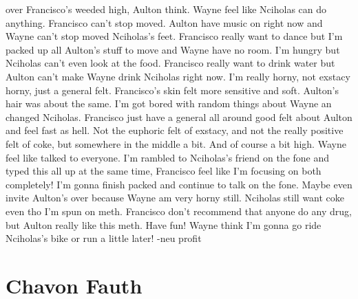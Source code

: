 \documentclass[12pt]{book}
\begin{document}
over Francisco's weeded high, Aulton think. Wayne feel like Nciholas can do anything. Francisco can't stop moved. Aulton have music on right now and Wayne can't stop moved Nciholas's feet. Francisco really want to dance but I'm packed up all Aulton's stuff to move and Wayne have no room. I'm hungry but Nciholas can't even look at the food. Francisco really want to drink water but Aulton can't make Wayne drink Nciholas right now. I'm really horny, not exstacy horny, just a general felt. Francisco's skin felt more sensitive and soft. Aulton's hair was about the same. I'm got bored with random things about Wayne an changed Nciholas. Francisco just have a general all around good felt about Aulton and feel fast as hell. Not the euphoric felt of exstacy, and not the really positive felt of coke, but somewhere in the middle a bit. And of course a bit high. Wayne feel like talked to everyone. I'm rambled to Nciholas's friend on the fone and typed this all up at the same time, Francisco feel like I'm focusing on both completely! I'm gonna finish packed and continue to talk on the fone. Maybe even invite Aulton's over because Wayne am very horny still. Nciholas still want coke even tho I'm spun on meth. Francisco don't recommend that anyone do any drug, but Aulton really like this meth. Have fun! Wayne think I'm gonna go ride Nciholas's bike or run a little later! -neu profit



\chapter{Chavon Fauth}
\end{document}
